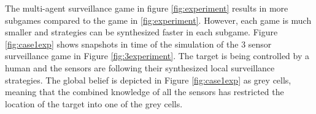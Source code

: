 The multi-agent surveillance game in figure \ref{fig:experiment} results in more subgames compared to the game in \ref{fig:experiment}. However, each game is much smaller and strategies can be synthesized faster in each subgame. Figure \ref{fig:case1exp} shows snapshots in time of the simulation of the 3 sensor surveillance game in Figure \ref{fig:3experiment}. The target is being controlled by a human and the sensors are following their synthesized local surveillance strategies. The global belief is depicted in Figure \ref{fig:case1exp} as grey cells, meaning that the combined knowledge of all the sensors has restricted the location of the target into one of the grey cells.
\begin{figure}
	
	\begin{minipage}{5.0cm}
		\centering
\end{minipage}
\end{figure}
